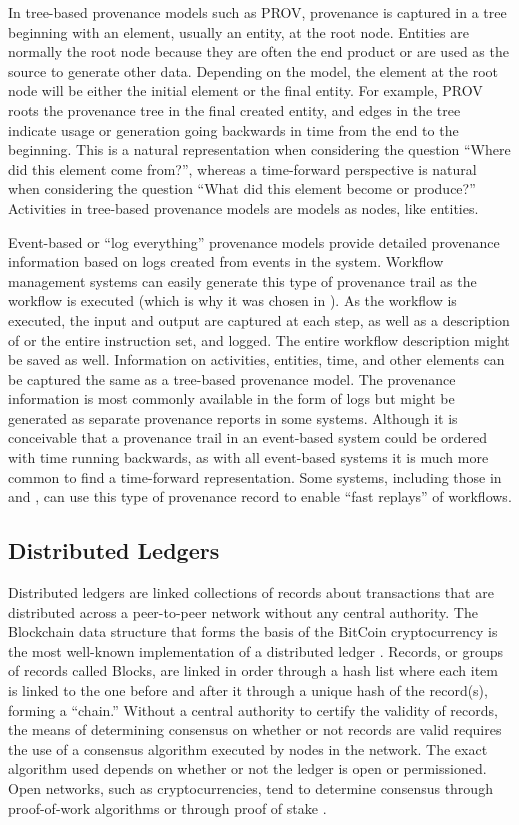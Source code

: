 In tree-based provenance models such as PROV, provenance is captured in a tree
beginning with an element, usually an entity, at the root node. Entities are
normally the root node because they are often the end product or are used as the
source to generate other data. Depending on the model, the element at the root
node will be either the initial element or the final entity. For example, PROV
roots the provenance tree in the final created entity, and edges in the tree
indicate usage or generation going backwards in time from the end to the
beginning. This is a natural representation when considering the question
``Where did this element come from?'', whereas a time-forward perspective is
natural when considering the question ``What did this element become or
produce?'' Activities in tree-based provenance models are models as nodes, like
entities.

Event-based or ``log everything'' provenance models provide detailed provenance
information based on logs created from events in the system. Workflow management
systems can easily generate this type of provenance trail as the workflow is
executed (which is why it was chosen in \cite{billings_eclipse_2017}). As the
workflow is executed, the input and output are captured at each step, as well as
a description of or the entire instruction set, and logged. The entire workflow
description might be saved as well. Information on activities, entities, time,
and other elements can be captured the same as a tree-based provenance model.
The provenance information is most commonly available in the form of logs but
might be generated as separate provenance reports in some systems. Although it
is conceivable that a provenance trail in an event-based system could be ordered
with time running backwards, as with all event-based systems it is much more
common to find a time-forward representation. Some systems, including those in
\cite{billings_eclipse_2017} and \cite{altintas_provenance_2006}, can use this
type of provenance record to enable ``fast replays'' of workflows.

\subsection{Distributed Ledgers}
Distributed ledgers are linked collections of records about transactions that
are distributed across a peer-to-peer network without any central authority. The
Blockchain data structure that forms the basis of the BitCoin cryptocurrency is
the most well-known implementation of a distributed ledger
\cite{nakamoto_bitcoin:_nodate}. Records, or groups of records called Blocks,
are linked in order through a hash list where each item is linked to the one
before and after it through a unique hash of the record(s), forming a ``chain.''
Without a central authority to certify the validity of records, the means of
determining consensus on whether or not records are valid requires the use of a
consensus algorithm executed by nodes in the network. The exact algorithm used
depends on whether or not the ledger is open or permissioned. Open networks,
such as cryptocurrencies, tend to determine consensus through proof-of-work
algorithms \cite{nakamoto_bitcoin:_nodate} or through proof of stake
\cite{noauthor_proof--stake_2018}.

